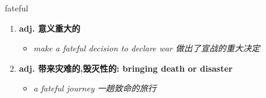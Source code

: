 
\begin{frame}
{\huge fateful}
\begin{center}
\begin{enumerate}\Large
  \item \textbf{adj. 意义重大的}
  \begin{itemize}
    \item \em{\Large{make a fateful decision to declare war 做出了宣战的重大决定}}
  \end{itemize}
  \item \textbf{adj. 带来灾难的,毁灭性的: bringing death or disaster}
  \begin{itemize}
    \item \em{\Large{a fateful journey 一趟致命的旅行}}
  \end{itemize}
\end{enumerate}
\end{center}
\end{frame}

